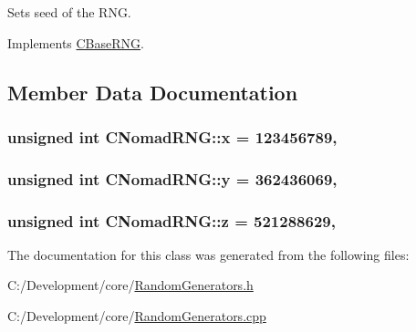Sets seed of the R\-N\-G. 



Implements \hyperlink{class_c_base_r_n_g_a56fbf75ca07b73954596ee04820e0b07}{C\-Base\-R\-N\-G}.



\subsection{Member Data Documentation}
\hypertarget{class_c_nomad_r_n_g_ac5867625fe6608450421de3166e38fd8}{
\subsubsection[{x}]{\setlength{\rightskip}{0pt plus 5cm}unsigned int C\-Nomad\-R\-N\-G\-::x = 123456789\hspace{0.3cm}{\ttfamily [static]}, {\ttfamily [private]}}}\label{class_c_nomad_r_n_g_ac5867625fe6608450421de3166e38fd8}
\hypertarget{class_c_nomad_r_n_g_ae5ab3fef08b3818ae0b72d7f705cbb07}{
\subsubsection[{y}]{\setlength{\rightskip}{0pt plus 5cm}unsigned int C\-Nomad\-R\-N\-G\-::y = 362436069\hspace{0.3cm}{\ttfamily [static]}, {\ttfamily [private]}}}\label{class_c_nomad_r_n_g_ae5ab3fef08b3818ae0b72d7f705cbb07}
\hypertarget{class_c_nomad_r_n_g_ad566dc723566cf9c6ec324b3ef1cc008}{
\subsubsection[{z}]{\setlength{\rightskip}{0pt plus 5cm}unsigned int C\-Nomad\-R\-N\-G\-::z = 521288629\hspace{0.3cm}{\ttfamily [static]}, {\ttfamily [private]}}}\label{class_c_nomad_r_n_g_ad566dc723566cf9c6ec324b3ef1cc008}


The documentation for this class was generated from the following files\-:\begin{DoxyCompactItemize}
\item 
C\-:/\-Development/core/\hyperlink{_random_generators_8h}{Random\-Generators.\-h}\item 
C\-:/\-Development/core/\hyperlink{_random_generators_8cpp}{Random\-Generators.\-cpp}\end{DoxyCompactItemize}
